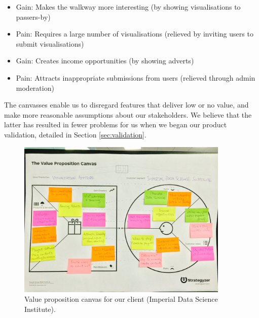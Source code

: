 \documentclass[a4paper, titlepage]{article}
\begin{document}
\begin{itemize}

  \item Gain: Makes the walkway more interesting (by showing visualisations to passers-by)

  \item Pain: Requires a large number of visualisations (relieved by inviting users to submit visualisations)

  \item Gain: Creates income opportunities (by showing adverts)

  \item Pain: Attracts inappropriate submissions from users (relieved through admin moderation)


\end{itemize}

The canvasses enable us to disregard features that deliver low or no value, and make more reasonable assumptions about our stakeholders. We believe that the latter has resulted in fewer problems for us when we began our product validation, detailed in Section \ref{sec:validation}.

\begin{figure}[ht]
   \begin{center}
      \includegraphics[width = 0.9\textwidth, trim = 1cm 6.5cm 1cm 4.5cm, clip]{./eval/value_prop_canvas.jpg}
   \end{center}
   \caption{Value proposition canvas for our client (Imperial Data Science Institute).}
   \label{fig:eval_valpropcanvas}
\end{figure}
\end{document}
